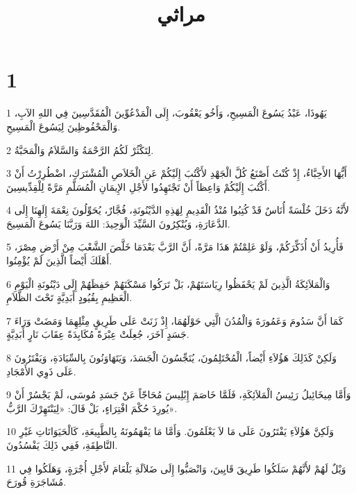 

\title{مراثي}


\chapter{1}

\par 1 يَهُوذَا، عَبْدُ يَسُوعَ الْمَسِيحِ، وَأَخُو يَعْقُوبَ، إِلَى الْمَدْعُوِّينَ الْمُقَدَّسِينَ فِي اللهِ الآبِ، وَالْمَحْفُوظِينَ لِيَسُوعَ الْمَسِيحِ.
\par 2 لِتَكْثُرْ لَكُمُ الرَّحْمَةُ وَالسَّلاَمُ وَالْمَحَبَّةُ.
\par 3 أَيُّهَا الأَحِبَّاءُ، إِذْ كُنْتُ أَصْنَعُ كُلَّ الْجَهْدِ لأَكْتُبَ إِلَيْكُمْ عَنِ الْخَلاَصِ الْمُشْتَرَكِ، اضْطُرِرْتُ أَنْ أَكْتُبَ إِلَيْكُمْ وَاعِظاً أَنْ تَجْتَهِدُوا لأَجْلِ الإِيمَانِ الْمُسَلَّمِ مَرَّةً لِلْقِدِّيسِينَ.
\par 4 لأَنَّهُ دَخَلَ خُلْسَةً أُنَاسٌ قَدْ كُتِبُوا مُنْذُ الْقَدِيمِ لِهَذِهِ الدَّيْنُونَةِ، فُجَّارٌ، يُحَوِّلُونَ نِعْمَةَ إِلَهِنَا إِلَى الدَّعَارَةِ، وَيُنْكِرُونَ السَّيِّدَ الْوَحِيدَ: اللهَ وَرَبَّنَا يَسُوعَ الْمَسِيحَ.
\par 5 فَأُرِيدُ أَنْ أُذَكِّرَكُمْ، وَلَوْ عَلِمْتُمْ هَذَا مَرَّةً، أَنَّ الرَّبَّ بَعْدَمَا خَلَّصَ الشَّعْبَ مِنْ أَرْضِ مِصْرَ، أَهْلَكَ أَيْضاً الَّذِينَ لَمْ يُؤْمِنُوا.
\par 6 وَالْمَلاَئِكَةُ الَّذِينَ لَمْ يَحْفَظُوا رِيَاسَتَهُمْ، بَلْ تَرَكُوا مَسْكَنَهُمْ حَفِظَهُمْ إِلَى دَيْنُونَةِ الْيَوْمِ الْعَظِيمِ بِقُيُودٍ أَبَدِيَّةٍ تَحْتَ الظَّلاَمِ.
\par 7 كَمَا أَنَّ سَدُومَ وَعَمُورَةَ وَالْمُدُنَ الَّتِي حَوْلَهُمَا، إِذْ زَنَتْ عَلَى طَرِيقٍ مِثْلِهِمَا وَمَضَتْ وَرَاءَ جَسَدٍ آخَرَ، جُعِلَتْ عِبْرَةً مُكَابِدَةً عِقَابَ نَارٍ أَبَدِيَّةٍ.
\par 8 وَلَكِنْ كَذَلِكَ هَؤُلاَءِ أَيْضاً، الْمُحْتَلِمُونَ، يُنَجِّسُونَ الْجَسَدَ، وَيَتَهَاوَنُونَ بِالسِّيَادَةِ، وَيَفْتَرُونَ عَلَى ذَوِي الأَمْجَادِ.
\par 9 وَأَمَّا مِيخَائِيلُ رَئِيسُ الْمَلاَئِكَةِ، فَلَمَّا خَاصَمَ إِبْلِيسَ مُحَاجّاً عَنْ جَسَدِ مُوسَى، لَمْ يَجْسُرْ أَنْ يُورِدَ حُكْمَ افْتِرَاءٍ، بَلْ قَالَ: «لِيَنْتَهِرْكَ الرَّبُّ».
\par 10 وَلَكِنَّ هَؤُلاَءِ يَفْتَرُونَ عَلَى مَا لاَ يَعْلَمُونَ. وَأَمَّا مَا يَفْهَمُونَهُ بِالطَّبِيعَةِ، كَالْحَيَوَانَاتِ غَيْرِ النَّاطِقَةِ، فَفِي ذَلِكَ يَفْسُدُونَ.
\par 11 وَيْلٌ لَهُمْ لأَنَّهُمْ سَلَكُوا طَرِيقَ قَايِينَ، وَانْصَبُّوا إِلَى ضَلاَلَةِ بَلْعَامَ لأَجْلِ أُجْرَةٍ، وَهَلَكُوا فِي مُشَاجَرَةِ قُورَحَ.
